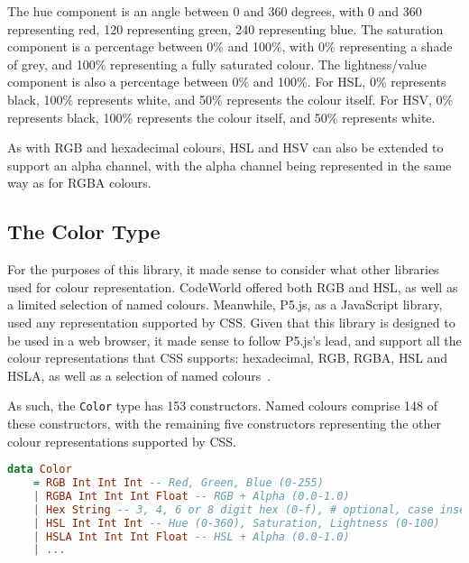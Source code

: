 \documentclass[../main.tex]{subfiles}
\begin{document}
                The hue component is an angle between 0 and 360 degrees, with 0 and 360
                    representing red, 120 representing green, 240 representing blue.
                The saturation component is a percentage between 0\% and 100\%, with 0\%
                    representing a shade of grey, and 100\% representing a fully saturated colour.
                The lightness/value component is also a percentage between 0\% and 100\%.
                For HSL, 0\% represents black, 100\% represents white, and 50\% represents the
                    colour itself.
                For HSV, 0\% represents black, 100\% represents the colour itself, and 50\%
                    represents white.

                As with RGB and hexadecimal colours, HSL and HSV can also be extended to
                    support an alpha channel, with the alpha channel being represented in the same
                    way as for RGBA colours.

        \subsection{The Color Type}
            For the purposes of this library, it made sense to consider what other
                libraries used for colour representation.
            CodeWorld offered both RGB and HSL, as well as a limited selection of named
                colours.
            Meanwhile, P5.js, as a JavaScript library, used any representation supported by
                CSS.
            Given that this library is designed to be used in a web browser, it made sense
                to follow P5.js's lead, and support all the colour representations that CSS
                supports: hexadecimal, RGB, RGBA, HSL and HSLA, as well as a selection of named
                colours~\citep{cssColours}.

            As such, the \verb|Color| type has 153 constructors.
            Named colours comprise 148 of these constructors, with the remaining five
                constructors representing the other colour representations supported by CSS.

            \begin{lstlisting}[language=haskell, label={lst:color}, caption={The Color type definition.
                Named colours have been omitted, but are included in the actual implementation, as seen 
                in Appendix~\ref{app:code}.}]
data Color
    = RGB Int Int Int -- Red, Green, Blue (0-255)
    | RGBA Int Int Int Float -- RGB + Alpha (0.0-1.0)
    | Hex String -- 3, 4, 6 or 8 digit hex (0-f), # optional, case insensitive
    | HSL Int Int Int -- Hue (0-360), Saturation, Lightness (0-100)
    | HSLA Int Int Int Float -- HSL + Alpha (0.0-1.0)
    | ...\end{lstlisting}
\end{document}

